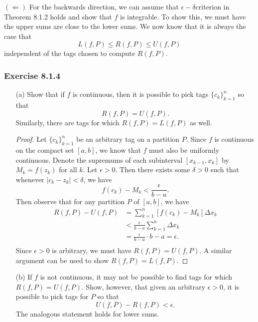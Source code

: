 \( (\Leftarrow) \) For the backwards direction, we can assume that \( \epsilon -\delta \)criterion in Theorem 8.1.2 holds and show that \( f  \) is integrable. To show this, we must have the upper sums are close to the lower sums. We now know that it is always the case that 
\[  L(f,P) \leq R(f,P) \leq U(f,P) \] independent of the tags chosen to compute \( R(f,P)  \). 
\subsubsection{Exercise 8.1.4} 
\begin{enumerate}
    \item[(a)] Show that if \( f  \) is continuous, then it is possible to pick tags \( \{ c_{k } \}_{k=1}^n  \) so that 
        \[  R(f,P) = U(f,P). \] Similarly, there are tags for which \( R(f,P) = L(f,P)  \) as well.
        \begin{proof}
            Let \( \{ c_{k }  \}_{k=1}^n  \) be an arbitrary tag on a partition \( P \). Since \( f \) is continuous on the compact set \( [a,b] \), we know that \( f  \) must also be uniformly continuous. Denote the supremums of each subinterval \(  [x_{k-1}, x_{k }] \) by \( M_{k } = f(z_{k })  \) for all \( k  \).  Let \( \epsilon >0  \). Then there exists some \( \delta > 0  \) such that whenever \( | c_{k } - z_{k } | < \delta  \), we have 
            \[   f(c_{k}) - M_{k }     < \frac{ \epsilon  }{ b -a  }. \] Then observe that for any partition \( P  \) of \( [a,b]  \), we have
        \begin{align*}
            R(f,P) - U(f, P) &= \sum_{ k=1 }^{ n } [f(c_{k }) - M_{k } ] \Delta x_{k } \\
                             &< \frac{ \epsilon  }{ b -a  } \sum_{ k=1 }^{ n } \Delta x_{k } \\
                             &= \frac{ \epsilon  }{ b -a  } \cdot b-a = \epsilon. \\
        \end{align*}
        Since \( \epsilon > 0 \) is arbitrary, we must have \( R(f,P) = U(f,P) \). A similar argument can be used to show \( R(f,P) = L(f,P) \).
        \end{proof}
    \item[(b)] If \( f  \) is not continuous, it may not be possible to find tags for which \( R(f,P) = U(f,P) \). Show, however, that given an arbitrary \( \epsilon >0  \), it is possible to pick tags for \( P  \) so that 
        \[  U(f,P) - R(f,P) < \epsilon. \] The analogous statement holds for lower sums.

\end{enumerate}
